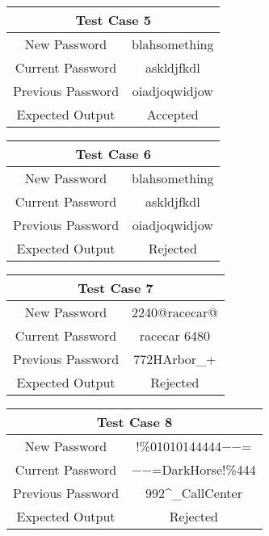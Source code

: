 \documentclass[12pt,letterpaper]{article}
\begin{document}
\begin{table}[h]
\begin{centering}
\begin{tabular}{||c|c||}
  \hline
  \multicolumn{2}{||c||}{Test Case 5} \\
  \hline
  New Password & blahsomething \\
  \hline
  Current Password & askldjfkdl \\
  \hline
  Previous Password & oiadjoqwidjow \\
  \hline
  Expected Output & Accepted \\
  \hline
  \end{tabular}
  \begin{tabular}{||c|c||}
  \hline
  \multicolumn{2}{||c||}{Test Case 6} \\
  \hline
  New Password & blahsomething \\
  \hline
  Current Password & askldjfkdl \\
  \hline
  Previous Password & oiadjoqwidjow \\
  \hline
  Expected Output & Rejected \\
  \hline
  \end{tabular}
  \begin{tabular}{||c|c||}
  \hline
  \multicolumn{2}{||c||}{Test Case 7} \\
  \hline
  New Password & 2240@racecar@ \\
  \hline
  Current Password & racecar 6480 \\
  \hline
  Previous Password & 772HArbor\_+ \\
  \hline
  Expected Output & Rejected \\
  \hline
  \end{tabular}
  \begin{tabular}{||c|c||}
  \hline
  \multicolumn{2}{||c||}{Test Case 8} \\
  \hline
  New Password & !\%01010144444$-$$-$= \\
  \hline
  Current Password & $-$$-$=DarkHorse!\%444 \\
  \hline
  Previous Password & 992\^{}\_CallCenter \\
  \hline
  Expected Output & Rejected \\
  \hline
  \end{tabular}




\end{centering}


\end{table}
\end{document}
